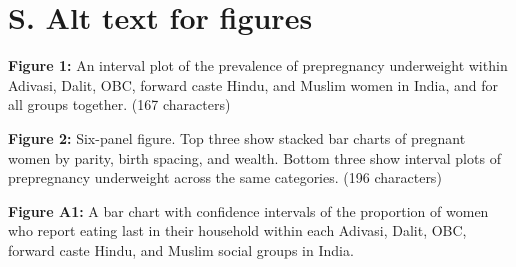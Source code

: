 \documentclass[12pt]{article}
\begin{document}
\section{S. Alt text for figures}

\textbf{Figure 1:}  An interval plot of the prevalence of prepregnancy underweight within Adivasi, Dalit, OBC, forward caste Hindu, and Muslim women in India, and for all groups together. (167 characters)

\textbf{Figure 2:} Six-panel figure. Top three show stacked bar charts of pregnant women by parity, birth spacing, and wealth. Bottom three show interval plots of prepregnancy underweight across the same categories. (196 characters)

\textbf{Figure A1:} A bar chart with confidence intervals of the proportion of women who report eating last in their household within each Adivasi, Dalit, OBC, forward caste Hindu, and Muslim social groups in India.


 
\end{document}

